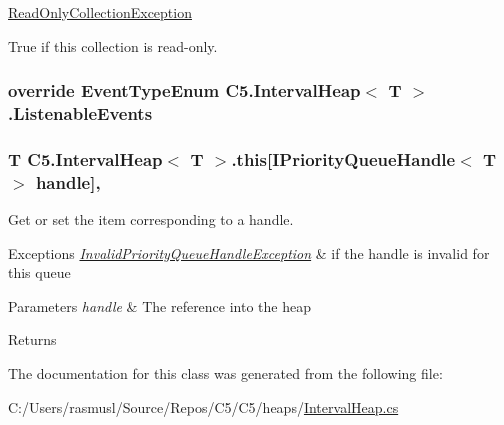 {\ttfamily \hyperlink{class_c5_1_1_read_only_collection_exception}{Read\+Only\+Collection\+Exception}} 

True if this collection is read-\/only.\hypertarget{class_c5_1_1_interval_heap_aea675c936b84378eaa72d208a80605dd}{}
\subsubsection[{Listenable\+Events}]{\setlength{\rightskip}{0pt plus 5cm}override {\bf Event\+Type\+Enum} {\bf C5.\+Interval\+Heap}$<$ T $>$.Listenable\+Events\hspace{0.3cm}{\ttfamily [get]}}\label{class_c5_1_1_interval_heap_aea675c936b84378eaa72d208a80605dd}




\hypertarget{class_c5_1_1_interval_heap_a91e32b822986bd74b9e3862a767d0c13}{}
\subsubsection[{this[I\+Priority\+Queue\+Handle$<$ T $>$ handle]}]{\setlength{\rightskip}{0pt plus 5cm}T {\bf C5.\+Interval\+Heap}$<$ T $>$.this\mbox{[}{\bf I\+Priority\+Queue\+Handle}$<$ T $>$ handle\mbox{]}\hspace{0.3cm}{\ttfamily [get]}, {\ttfamily [set]}}\label{class_c5_1_1_interval_heap_a91e32b822986bd74b9e3862a767d0c13}


Get or set the item corresponding to a handle. 


\begin{DoxyExceptions}{Exceptions}
{\em \hyperlink{class_c5_1_1_invalid_priority_queue_handle_exception}{Invalid\+Priority\+Queue\+Handle\+Exception}} & if the handle is invalid for this queue\\
\hline
\end{DoxyExceptions}

\begin{DoxyParams}{Parameters}
{\em handle} & The reference into the heap\\
\hline
\end{DoxyParams}
\begin{DoxyReturn}{Returns}

\end{DoxyReturn}


The documentation for this class was generated from the following file\+:\begin{DoxyCompactItemize}
\item 
C\+:/\+Users/rasmusl/\+Source/\+Repos/\+C5/\+C5/heaps/\hyperlink{_interval_heap_8cs}{Interval\+Heap.\+cs}\end{DoxyCompactItemize}

